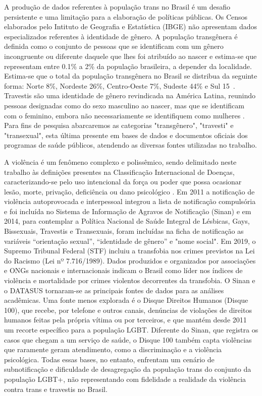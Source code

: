 \documentclass[12pt]{article}
\begin{document}
A produção de dados referentes à população trans no Brasil é um desafio persistente e uma limitação para a elaboração de políticas públicas. Os Censos elaborados pelo Intituto de Geografia e Estatística (IBGE) não apresentam dados especializados referentes à identidade de gênero. A população transgênera é definida como o conjunto de pessoas que se identificam com um gênero incongruente ou diferente daquele que lhes foi atribuído ao nascer e estima-se que representam entre 0.1\% a 2\% da população brasileira, a depender da localidade. Estima-se que o total da população transgênera no Brasil se distribua da seguinte forma: Norte 8\%, Nordeste 26\%, Centro-Oeste 7\%, Sudeste 44\% e Sul 15\ \cite{spizziri_eufrasio_lima:2021}. Travestis  são uma identidade de gênero revindicada na América Latina, reunindo pessoas designadas como do sexo masculino ao nascer, mas que se identificam com o feminino, embora não necessariamente se identifiquem como mulheres \cite{leal_silva_lizzi:2026}. Para fins de pesquisa abarcaremos as categorias "transgênero", "travesti" e "transexual", esta última presente em bases de dados e documentos oficiais dos programas de saúde públicos, atendendo as diversas fontes utilizadas no trabalho.

A violência é um fenômeno complexo e polissêmico, sendo delimitado neste trabalho às definições presentes na Classificação Internacional de Doenças, caracterizando-se pelo uso intencional da força ou poder que possa ocasionar lesão, morte, privação, deficiência ou dano psicológico \cite{marinho_tomazelli_firianelli:2024}. Em 2011 a notificação de violência autoprovocada e interpessoal integrou a lista de notificação compulsória e foi incluída no Sistema de Informação de Agravos de Notificação (Sinan) e em 2014, para contemplar a Política Nacional de Saúde Integral de Lésbicas, Gays, Bissexuais, Travestis e Transexuais, foram incluídas na ficha de notificação as variáveis “orientação sexual”, “identidade de gênero” e "nome social". Em 2019, o Supremo Tribunal Federal (STF) incluiu a transfobia nos crimes previstos na Lei do Racismo (Lei nº 7.716/1989). Dados produzidos e organizados por associações e ONGs nacionais e internacionais indicam o Brasil como líder nos índices de violência e mortalidade por crimes violentos decorrentes da transfobia. O Sinan e o DATASUS tornaram-se as principais fontes de dados para as análises acadêmicas. Uma fonte menos explorada é o Disque Direitos Humanos (Disque 100), que recebe, por telefone e outros canais, denúncias de violações de direitos humanos feitas pela própria vítima ou por terceiros, e que mantém desde 2011 um recorte específico para a população LGBT. Diferente do Sinan, que registra os casos que chegam a um serviço de saúde, o Disque 100 também capta violências que raramente geram atendimento, como a discriminação e a violência psicológica. Todas essas bases, no entanto, enfrentam um cenário de subnotificação e dificuldade de desagregação da população trans do conjunto da população LGBT+, não representando com fidelidade a realidade da violência contra trans e travestis no Brasil.
\end{document}

